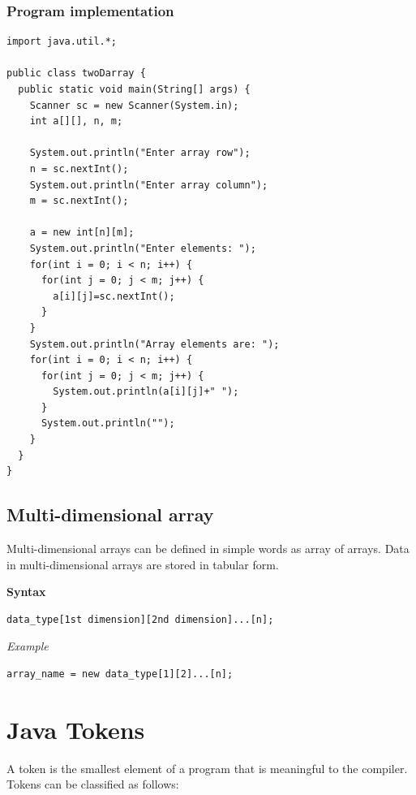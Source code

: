 \documentclass[twocolumn, a4paper]{article}
\begin{document}
\subsubsection{Program implementation}
\begin{lstlisting}
import java.util.*;

public class twoDarray {
  public static void main(String[] args) {
    Scanner sc = new Scanner(System.in);
    int a[][], n, m;

    System.out.println("Enter array row");
    n = sc.nextInt();
    System.out.println("Enter array column");
    m = sc.nextInt();

    a = new int[n][m];
    System.out.println("Enter elements: ");
    for(int i = 0; i < n; i++) {
      for(int j = 0; j < m; j++) {
        a[i][j]=sc.nextInt();
      }
    }
    System.out.println("Array elements are: ");
    for(int i = 0; i < n; i++) {
      for(int j = 0; j < m; j++) {
        System.out.println(a[i][j]+" ");
      }
      System.out.println("");
    }
  }
}
\end{lstlisting}
\subsection{Multi-dimensional array}
Multi-dimensional arrays can be defined in simple words as array of arrays.
Data in multi-dimensional arrays are stored in tabular form.

\noindent\textbf{Syntax}
\begin{lstlisting}
data_type[1st dimension][2nd dimension]...[n];
\end{lstlisting}
\vskip10pt
\noindent\emph{Example}
\begin{lstlisting}
array_name = new data_type[1][2]...[n];
\end{lstlisting}

\section{Java Tokens}
A token is the smallest element of a program that is meaningful to the
compiler. Tokens can be classified as follows:
\end{document}
